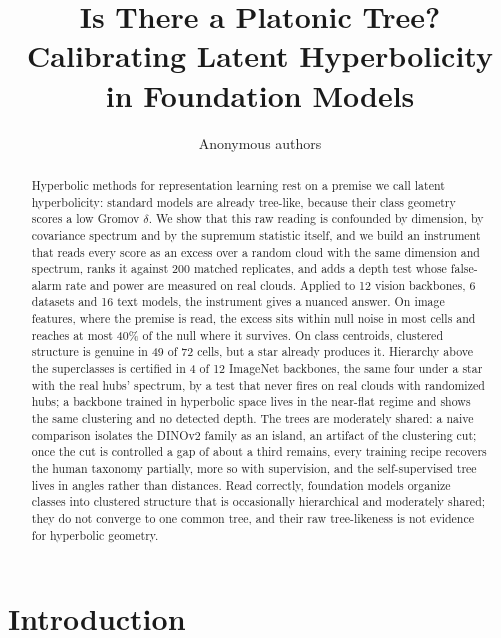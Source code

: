 \documentclass{article}
\title{Is There a Platonic Tree? \\ Calibrating Latent Hyperbolicity \\ in Foundation Models}
\author{Anonymous authors}
\theoremstyle{definition}
\begin{document}
\maketitle
\raggedbottom   %

\begin{abstract}
Hyperbolic methods for representation learning rest on a premise we call latent hyperbolicity: standard models are already tree-like, because their class geometry scores a low Gromov $\delta$. We show that this raw reading is confounded by dimension, by covariance spectrum and by the supremum statistic itself, and we build an instrument that reads every score as an excess over a random cloud with the same dimension and spectrum, ranks it against 200 matched replicates, and adds a depth test whose false-alarm rate and power are measured on real clouds. Applied to 12 vision backbones, 6 datasets and 16 text models, the instrument gives a nuanced answer. On image features, where the premise is read, the excess sits within null noise in most cells and reaches at most 40\% of the null where it survives. On class centroids, clustered structure is genuine in 49 of 72 cells, but a star already produces it. Hierarchy above the superclasses is certified in 4 of 12 ImageNet backbones, the same four under a star with the real hubs' spectrum, by a test that never fires on real clouds with randomized hubs; a backbone trained in hyperbolic space lives in the near-flat regime and shows the same clustering and no detected depth. The trees are moderately shared: a naive comparison isolates the DINOv2 family as an island, an artifact of the clustering cut; once the cut is controlled a gap of about a third remains, every training recipe recovers the human taxonomy partially, more so with supervision, and the self-supervised tree lives in angles rather than distances. Read correctly, foundation models organize classes into clustered structure that is occasionally hierarchical and moderately shared; they do not converge to one common tree, and their raw tree-likeness is not evidence for hyperbolic geometry. %
\end{abstract}

\section{Introduction}
\label{sec:introduction}
\end{document}

